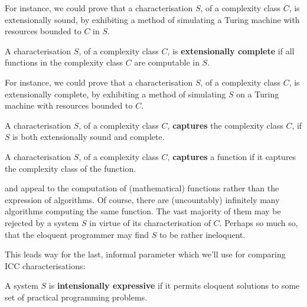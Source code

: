 For instance, we could prove that a characterisation $S$, of a complexity class
$C$, is extensionally sound, by exhibiting a method of simulating a Turing
machine with resources bounded to $C$ in $S$.

\begin{definition} \label{def:icc-completeness} A characterisation $S$, of a
complexity class $C$, is \textbf{extensionally complete} if all functions in
the complexity class $C$ are computable in $S$.\end{definition}

For instance, we could prove that a characterisation $S$, of a complexity class
$C$, is extensionally complete, by exhibiting a method of simulating $S$ on a
Turing machine with resources bounded to $C$.

\begin{definition} \label{def:icc-capture} A characterisation $S$, of a
complexity class $C$, \textbf{captures} the complexity class $C$, if $S$ is
both extensionally sound and complete.  \end{definition}


\begin{definition} \label{def:function-capture} A characterisation $S$, of a
complexity class $C$, \textbf{captures} a function if it captures the
complexity class of the function. \end{definition}


 and  appeal to the computation
of (mathematical) functions rather than the expression of algorithms. Of
course, there are (uncountably) infinitely many algorithms computing the same
function. The vast majority of them may be rejected by a system $S$ in virtue
of its characterisation of $C$. Perhaps so much so, that the eloquent
programmer may find $S$ to be rather ineloquent.


This leads way for the last, informal parameter which we'll use for comparing
ICC characterisations:


\begin{notion} A system $S$ is \textbf{intensionally expressive} if it permits
eloquent solutions to some set of practical programming problems.\end{notion}

